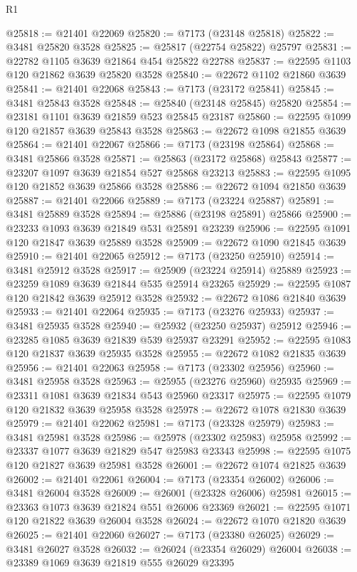 \begin{lexlean}{R1}
\begin{coremodule}
@25818 := @21401 @22069
@25820 := @7173 (@23148 @25818)
@25822 := @3481 @25820 @3528
@25825 := @25817 (@22754 @25822) @25797
@25831 := @22782 @1105 @3639 @21864 @454 @25822 @22788
@25837 := @22595 @1103 @120 @21862 @3639 @25820 @3528
@25840 := @22672 @1102 @21860 @3639
@25841 := @21401 @22068
@25843 := @7173 (@23172 @25841)
@25845 := @3481 @25843 @3528
@25848 := @25840 (@23148 @25845) @25820
@25854 := @23181 @1101 @3639 @21859 @523 @25845 @23187
@25860 := @22595 @1099 @120 @21857 @3639 @25843 @3528
@25863 := @22672 @1098 @21855 @3639
@25864 := @21401 @22067
@25866 := @7173 (@23198 @25864)
@25868 := @3481 @25866 @3528
@25871 := @25863 (@23172 @25868) @25843
@25877 := @23207 @1097 @3639 @21854 @527 @25868 @23213
@25883 := @22595 @1095 @120 @21852 @3639 @25866 @3528
@25886 := @22672 @1094 @21850 @3639
@25887 := @21401 @22066
@25889 := @7173 (@23224 @25887)
@25891 := @3481 @25889 @3528
@25894 := @25886 (@23198 @25891) @25866
@25900 := @23233 @1093 @3639 @21849 @531 @25891 @23239
@25906 := @22595 @1091 @120 @21847 @3639 @25889 @3528
@25909 := @22672 @1090 @21845 @3639
@25910 := @21401 @22065
@25912 := @7173 (@23250 @25910)
@25914 := @3481 @25912 @3528
@25917 := @25909 (@23224 @25914) @25889
@25923 := @23259 @1089 @3639 @21844 @535 @25914 @23265
@25929 := @22595 @1087 @120 @21842 @3639 @25912 @3528
@25932 := @22672 @1086 @21840 @3639
@25933 := @21401 @22064
@25935 := @7173 (@23276 @25933)
@25937 := @3481 @25935 @3528
@25940 := @25932 (@23250 @25937) @25912
@25946 := @23285 @1085 @3639 @21839 @539 @25937 @23291
@25952 := @22595 @1083 @120 @21837 @3639 @25935 @3528
@25955 := @22672 @1082 @21835 @3639
@25956 := @21401 @22063
@25958 := @7173 (@23302 @25956)
@25960 := @3481 @25958 @3528
@25963 := @25955 (@23276 @25960) @25935
@25969 := @23311 @1081 @3639 @21834 @543 @25960 @23317
@25975 := @22595 @1079 @120 @21832 @3639 @25958 @3528
@25978 := @22672 @1078 @21830 @3639
@25979 := @21401 @22062
@25981 := @7173 (@23328 @25979)
@25983 := @3481 @25981 @3528
@25986 := @25978 (@23302 @25983) @25958
@25992 := @23337 @1077 @3639 @21829 @547 @25983 @23343
@25998 := @22595 @1075 @120 @21827 @3639 @25981 @3528
@26001 := @22672 @1074 @21825 @3639
@26002 := @21401 @22061
@26004 := @7173 (@23354 @26002)
@26006 := @3481 @26004 @3528
@26009 := @26001 (@23328 @26006) @25981
@26015 := @23363 @1073 @3639 @21824 @551 @26006 @23369
@26021 := @22595 @1071 @120 @21822 @3639 @26004 @3528
@26024 := @22672 @1070 @21820 @3639
@26025 := @21401 @22060
@26027 := @7173 (@23380 @26025)
@26029 := @3481 @26027 @3528
@26032 := @26024 (@23354 @26029) @26004
@26038 := @23389 @1069 @3639 @21819 @555 @26029 @23395

\end{coremodule}
\end{lexlean}
